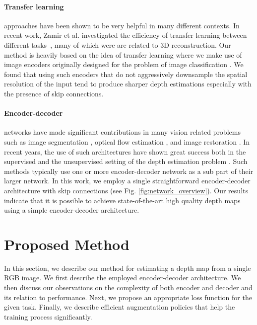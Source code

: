 \documentclass[10pt,twocolumn,letterpaper]{article}
\begin{document}
\paragraph{Transfer learning} approaches have been shown to be very helpful in many different contexts. In recent work, Zamir et al. investigated the efficiency of transfer learning between different tasks~\cite{Zamir2018TaskonomyDT}, many of which were are related to 3D reconstruction. Our method is heavily based on the idea of transfer learning where we make use of image encoders originally designed for the problem of image classification \cite{huang2017densely}. We found that using such encoders that do not aggressively downsample the spatial resolution of the input tend to produce sharper depth estimations especially with the presence of skip connections.

\paragraph{Encoder-decoder} networks have made significant contributions in many vision related problems such as image segmentation \cite{Ronneberger2015u}, optical flow estimation \cite{Dosovitskiy2015}, and image restoration \cite{LehtinenMHLKAA18}. In recent years, the use of such architectures have shown great success both in the supervised and the unsupervised setting of the depth estimation problem \cite{Godard2017,Ummenhofer2017,Huang2018DeepMVSLM,Zhou2018DeepTAMDT}. Such methods typically use one or more encoder-decoder network as a sub part of their larger network. In this work, we employ a single straightforward encoder-decoder architecture with skip connections (see Fig. \ref{fig:network_overview}). Our results indicate that it is possible to achieve state-of-the-art high quality depth maps using a simple encoder-decoder architecture.


\section{Proposed Method} \label{sec:method}

In this section, we describe our method for estimating a depth map from a single RGB image. We first describe the employed encoder-decoder architecture. We then discuss our observations on the complexity of both encoder and decoder and its relation to performance. Next, we propose an appropriate loss function for the given task. Finally, we describe efficient augmentation policies that help the training process significantly.
\end{document}
